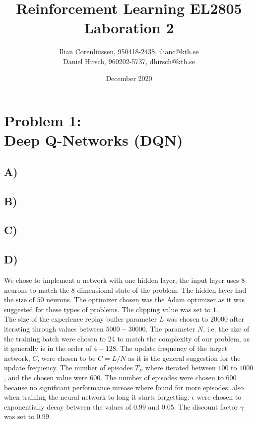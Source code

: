 \documentclass{article}
\title{Reinforcement Learning EL2805\\
       Laboration 2}
\author{Ilian Corenliussen, 950418-2438, ilianc@kth.se\\ 
        Daniel Hirsch, 960202-5737, dhirsch@kth.se}
\date{December 2020}
\begin{document}
\maketitle

\section*{Problem 1: \\
        Deep Q-Networks (DQN)}
\subsection*{A)}

\subsection*{B)}

\subsection*{C)}

\subsection*{D)}
We chose to implement a network with one hidden layer, the input layer uses $8$ neurons to match the 8-dimensional state of the problem. The hidden layer had the size of $50$ neurons. The optimizer chosen was the Adam optimizer as it was suggested for these types of problems. The clipping value was set to $1$.\\%

\noindent The size of the experience replay buffer parameter $L$ was chosen to $20000$ after iterating through values between $5000 - 30000$. The parameter $N$, i.e. the size of the training batch were chosen to $24$ to match the complexity of our problem, as it generally is in the order of $4 - 128$.
The update frequency of the target network, $C$, were chosen to be $C = L/N$ as it is the general suggestion for the update frequency. The number of episodes $T_E$ where iterated between $100$ to $1000$, and the chosen value were $600$. The number of episodes were chosen to $600$ because no significant performance inrease where found for more episodes, also when training the neural network to long it starts forgetting. $\epsilon$ were chosen to exponentially decay between the values of $0.99$ and $0.05$. The discount factor $\gamma$ was set to $0.99$. 
\end{document}

